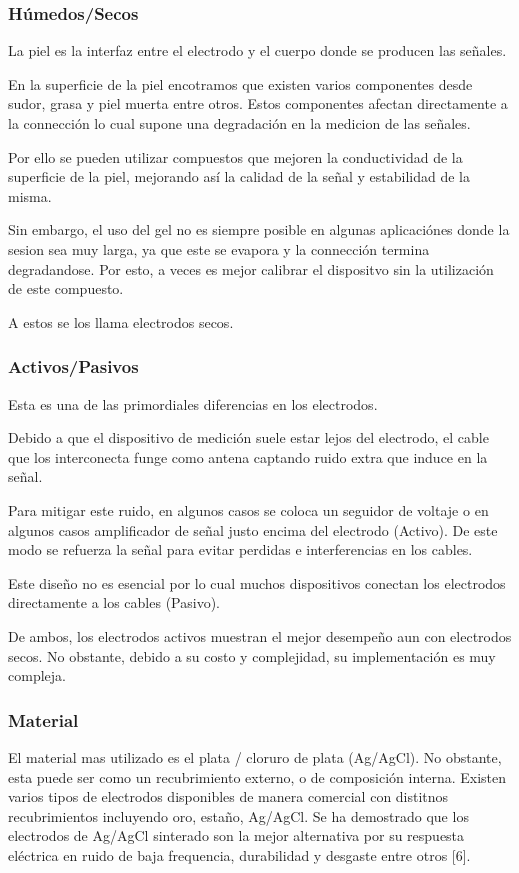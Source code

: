 \documentclass[11pt]{article}
\begin{document}
\subsubsection{Húmedos/Secos}
\label{sec:org173ec2f}
La piel es la interfaz entre el electrodo y el cuerpo donde se producen las señales.

En la superficie de la piel encotramos que existen varios componentes desde sudor, grasa y piel muerta entre otros. Estos componentes afectan directamente a la connección lo cual supone una degradación en la medicion de las señales.

Por ello se pueden utilizar compuestos que mejoren la conductividad de la superficie de la piel, mejorando así la calidad de la señal y estabilidad de la misma.

Sin embargo, el uso del gel no es siempre posible en algunas aplicaciónes donde la sesion sea muy larga, ya que este se evapora y la connección termina degradandose. Por esto, a veces es mejor calibrar el dispositvo sin la utilización de este compuesto.

A estos se los llama electrodos secos.

\subsubsection{Activos/Pasivos}
\label{sec:orga0116b4}
Esta es una de las primordiales diferencias en los electrodos.

Debido a que el dispositivo de medición suele estar lejos del electrodo, el cable que los interconecta funge como antena captando ruido extra que induce en la señal.

Para mitigar este ruido, en algunos casos se coloca un seguidor de voltaje o en algunos casos amplificador de señal justo encima del electrodo (Activo). De este modo se refuerza la señal para evitar perdidas e interferencias en los cables.

Este diseño no es esencial por lo cual muchos dispositivos conectan los electrodos directamente a los cables (Pasivo).

De ambos, los electrodos activos muestran el mejor desempeño aun con electrodos secos. No obstante, debido a su costo y complejidad, su implementación es muy compleja.

\subsubsection{Material}
\label{sec:org58948b3}
El material mas utilizado es el plata / cloruro de plata (Ag/AgCl). No obstante, esta puede ser como un recubrimiento externo, o de composición interna. Existen varios tipos de electrodos disponibles de manera comercial con distitnos recubrimientos incluyendo oro, estaño, Ag/AgCl. Se ha demostrado que los electrodos de Ag/AgCl sinterado son la mejor alternativa por su respuesta eléctrica en ruido de baja frequencia, durabilidad y desgaste entre otros [6].
\end{document}
